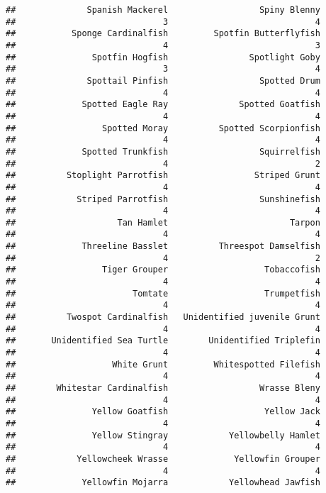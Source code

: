 \documentclass[
]{article}
\begin{document}
\begin{verbatim}
##              Spanish Mackerel                  Spiny Blenny 
##                             3                             4 
##           Sponge Cardinalfish         Spotfin Butterflyfish 
##                             4                             3 
##               Spotfin Hogfish                Spotlight Goby 
##                             3                             4 
##              Spottail Pinfish                  Spotted Drum 
##                             4                             4 
##             Spotted Eagle Ray              Spotted Goatfish 
##                             4                             4 
##                 Spotted Moray          Spotted Scorpionfish 
##                             4                             4 
##             Spotted Trunkfish                  Squirrelfish 
##                             4                             2 
##          Stoplight Parrotfish                 Striped Grunt 
##                             4                             4 
##            Striped Parrotfish                  Sunshinefish 
##                             4                             4 
##                    Tan Hamlet                        Tarpon 
##                             4                             4 
##             Threeline Basslet          Threespot Damselfish 
##                             4                             2 
##                 Tiger Grouper                   Tobaccofish 
##                             4                             4 
##                       Tomtate                   Trumpetfish 
##                             4                             4 
##          Twospot Cardinalfish   Unidentified juvenile Grunt 
##                             4                             4 
##       Unidentified Sea Turtle        Unidentified Triplefin 
##                             4                             4 
##                   White Grunt         Whitespotted Filefish 
##                             4                             4 
##        Whitestar Cardinalfish                  Wrasse Bleny 
##                             4                             4 
##               Yellow Goatfish                   Yellow Jack 
##                             4                             4 
##               Yellow Stingray            Yellowbelly Hamlet 
##                             4                             4 
##            Yellowcheek Wrasse             Yellowfin Grouper 
##                             4                             4 
##             Yellowfin Mojarra            Yellowhead Jawfish 

\end{verbatim}
\end{document}
